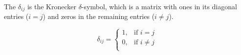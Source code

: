 The $\delta_{ij}$ is the Kronecker $\delta$-symbol, which is a matrix with ones
in its diagonal entries ($i = j$) and zeros in the remaining entries
($i \neq j$).

\begin{equation}
\delta _{ij} = 
\left \{ \begin{array}{cc}
1, & \mbox{if $i = j$} \\
0, & \mbox{if $i \neq j$} \\
\end{array}
\right.
\label{KRONECKER}
\end{equation}

